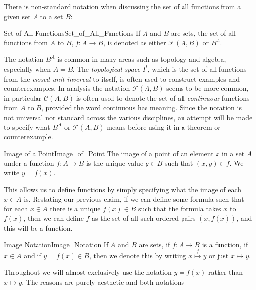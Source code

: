         There is non-standard notation when discussing the set of all functions
        from a given set $A$ to a set $B$:
        \begin{fnotation}{Set of All Functions}{Set_of_All_Functions}
            If $A$ and $B$ are sets, the set of all functions from $A$ to $B$,
            $f:A\rightarrow{B}$, is denoted as either $\mathcal{F}(A,B)$ or
            $B^{A}$.
        \end{fnotation}
        The notation $B^{A}$ is common in many areas such as topology and
        algebra, especially when $A=B$. The \textit{topological space} $I^{I}$,
        which is the set of all functions from the \textit{closed unit inverval}
         to itself, is often used to construct examples
        and counterexamples. In analysis the notation $\mathcal{F}(A,B)$ seems
        to be more common, in particular $\mathcal{C}(A,B)$ is often used to
        denote the set of all \textit{continuous} functions from $A$ to $B$,
        provided the word continuous has meaning. Since the notation is not
        universal nor standard across the various disciplines, an attempt will
        be made to specify what $B^{A}$ or $\mathcal{F}(A,B)$ means before using
        it in a theorem or counterexample.
        \begin{fdefinition}{Image of a Point}{Image_of_Point}
            The \gls{image of a point} of an element $x$ in a set $A$ under a
            \gls{function} $f:A\rightarrow{B}$ is the unique value $y\in{B}$
            such that $(x,y)\in{f}$. We write $y=f(x)$.
        \end{fdefinition}
        This allows us to define functions by simply specifying what the
        image of each $x\in{A}$ is. Restating our previous claim, if we can
        define some formula such that for each $x\in{A}$ there is a unique
        $f(x)\in{B}$ such that the formula takes $x$ to $f(x)$, then we can
        define $f$ as the set of all such ordered pairs $(x,f(x))$, and this
        will be a function.
        \begin{fnotation}{Image Notation}{Image_Notation}
            If $A$ and $B$ are sets, if $f:A\rightarrow{B}$ is a function,
            if $x\in{A}$ and if $y=f(x)\in{B}$, then we denote this by
            writing $x\overset{f}{\longmapsto}{y}$ or just $x\mapsto{y}$.
        \end{fnotation}
        Throughout we will almost exclusively use the notation $y=f(x)$ rather
        than $x\mapsto{y}$. The reasons are purely aesthetic and both notations
